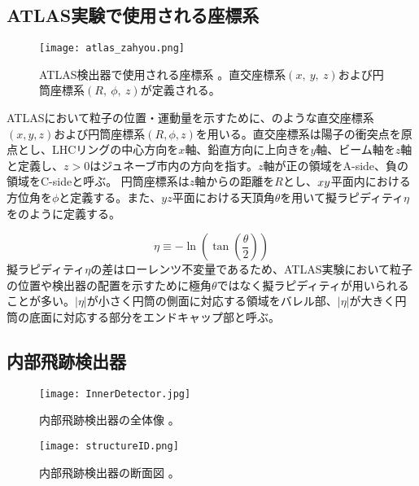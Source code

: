 \subsection{ATLAS実験で使用される座標系}
\label{sec:zahyoukei}
\begin{figure}[tbp]
  \centering
  \texttt{[image: atlas\_zahyou.png]}
  \caption[ATLAS検出器]{ATLAS検出器で使用される座標系 \cite{ATLAS}。直交座標系$(x,\ y,\ z)$および円筒座標系$(R,\ \phi,\ z)$が定義される。}
  \label{fig:atlaszahyou}
\end{figure}

ATLASにおいて粒子の位置・運動量を示すために、のような直交座標系$\left( x, y, z \right)$および円筒座標系$\left( R, \phi, z \right)$を用いる。直交座標系は陽子の衝突点を原点とし、LHCリングの中心方向を$x$軸、鉛直方向に上向きを$y$軸、ビーム軸を$z$軸と定義し、$z>0$はジュネーブ市内の方向を指す。$z$軸が正の領域をA-side、負の領域をC-sideと呼ぶ。
円筒座標系は$z$軸からの距離を$R$とし、$x\-y$平面内における方位角を$\phi$と定義する。また、$yz$平面における天頂角$\theta$を用いて擬ラピディティ$\eta$をのように定義する。

\begin{equation}
  \label{eq:eta}
  \eta \equiv  -\ln\left( \tan{\left( \frac{\theta}{2} \right)} \right)
\end{equation}
擬ラピディティ$\eta$の差はローレンツ不変量であるため、ATLAS実験において粒子の位置や検出器の配置を示すために極角$\theta$ではなく擬ラピディティが用いられることが多い。$|\eta|$が小さく円筒の側面に対応する領域をバレル部、$|\eta|$が大きく円筒の底面に対応する部分をエンドキャップ部と呼ぶ。

\subsection{内部飛跡検出器}
\label{sec:InnerDetector}
\begin{figure}[tbp]
  \begin{minipage}[b]{0.45\linewidth}
    \centering
    \texttt{[image: InnerDetector.jpg]}
    \caption[内部飛跡検出器の全体像]{内部飛跡検出器の全体像 \cite{naibuhisekizentai}。}
    \label{fig:InnerDetector}
  \end{minipage}
  \begin{minipage}[b]{0.45\linewidth}
    \centering
    \texttt{[image: structureID.png]}
    \caption[内部飛跡検出器の断面図]{内部飛跡検出器の断面図 \cite{naibuhisekidannmen}。}
    \label{fig:structureID}
  \end{minipage}
\end{figure}

